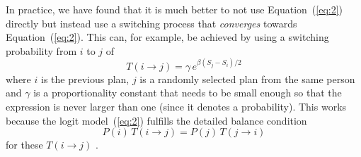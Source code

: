 In practice, we have found that it is much better to not use
Equation~(\ref{eq:2}) directly\corr{,}{} but instead use a switching process
that \emph{converges} towards Equation~(\ref{eq:2}).  
This can, for example, be
achieved by using a switching probability from $i$ to $j$ of 
\begin{equation}
T(i \to j) = \gamma \,  e^{\beta ( S_j - S_i )/2}
\label{eq:3}
\end{equation}
where $i$ is the previous plan, $j$ is a randomly selected plan from
the same person\corr{,}{} and $\gamma$ is a proportionality constant that needs
to be small enough so that the expression is never larger than one
(since it denotes a probability).  This works because the logit model~(\ref{eq:2})
fulfills the detailed balance condition
\begin{equation}
P(i) \, T(i \to j) = P(j) \, T(j \to i) 
\label{eq:detailed-balance}
\end{equation}
for these $T(i \!\! \to \!\! j)$ \citep[e.g.,][]{ross-2006}.%
